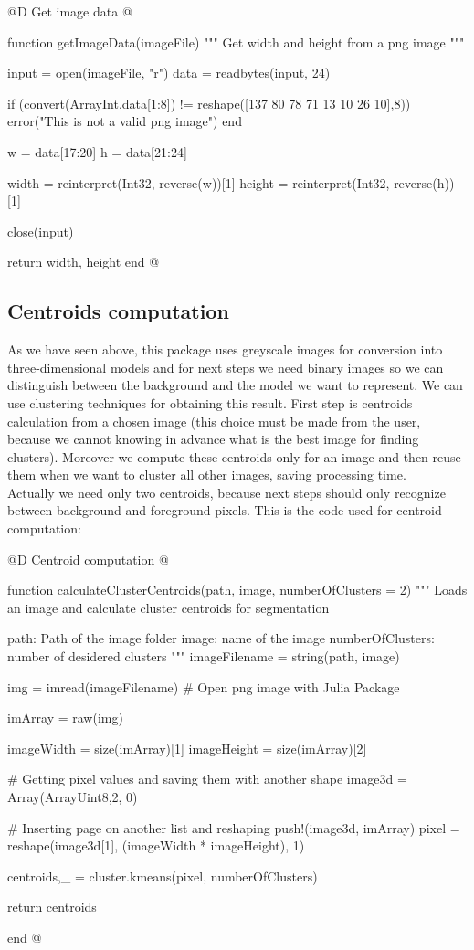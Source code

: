 \documentclass[11pt,oneside]{article}	%
\begin{document}
@D Get image data
@{function getImageData(imageFile)
  """
  Get width and height from a png image
  """

  input = open(imageFile, "r")
  data = readbytes(input, 24)
  
  if (convert(Array{Int},data[1:8]) != reshape([137 80 78 71 13 10 26 10],8))
    error("This is not a valid png image")
  end

  w = data[17:20]
  h = data[21:24]

  width = reinterpret(Int32, reverse(w))[1]
  height = reinterpret(Int32, reverse(h))[1]

  close(input)

  return width, height
end
@}

\subsection{Centroids computation}\label{sec:centroids}

As we have seen above, this package uses greyscale images for conversion into three-dimensional models and for next steps we need binary images so we can distinguish between the background and the model we want to represent. We can use clustering techniques for obtaining this result. First step is centroids calculation from a chosen image (this choice must be made from the user, because we cannot knowing in advance what is the best image for finding clusters).
Moreover we compute these centroids only for an image and then reuse them when we want to cluster all other images, saving processing time.\\
Actually we need only two centroids, because next steps should only recognize between background and foreground pixels.
This is the code used for centroid computation:

@D Centroid computation
@{function calculateClusterCentroids(path, image, numberOfClusters = 2)
  """
  Loads an image and calculate cluster centroids for segmentation

  path: Path of the image folder
  image: name of the image
  numberOfClusters: number of desidered clusters
  """
  imageFilename = string(path, image)

  img = imread(imageFilename) # Open png image with Julia Package

  imArray = raw(img)

  imageWidth = size(imArray)[1]
  imageHeight = size(imArray)[2]

  # Getting pixel values and saving them with another shape
  image3d = Array(Array{Uint8,2}, 0)

  # Inserting page on another list and reshaping
  push!(image3d, imArray)
  pixel = reshape(image3d[1], (imageWidth * imageHeight), 1)

  centroids,_ = cluster.kmeans(pixel, numberOfClusters)

  return centroids

end
@}
\end{document}
